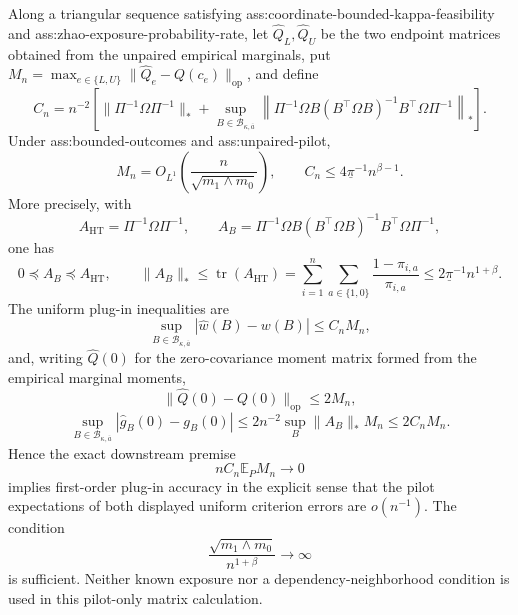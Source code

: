 Along a triangular sequence satisfying ass:coordinate-bounded-kappa-feasibility and ass:zhao-exposure-probability-rate, let \(\widehat Q_L,\widehat Q_U\) be the two endpoint matrices obtained from the unpaired empirical marginals, put \(M_n=\max_{e\in\{L,U\}}\lVert\widehat Q_e-Q(c_e)\rVert_{\mathrm{op}}\), and define
\[
C_n=n^{-2}\left[
\lVert\Pi^{-1}\Omega\Pi^{-1}\rVert_*
+\sup_{B\in\mathcal B_{\kappa,\overline a}}
\left\lVert\Pi^{-1}\Omega B(B^{\top}\Omega B)^{-1}B^{\top}\Omega\Pi^{-1}\right\rVert_*
\right].
\]
Under ass:bounded-outcomes and ass:unpaired-pilot,
\[
M_n=O_{L^1}\!\left(\frac{n}{\sqrt{m_1\wedge m_0}}\right),
\qquad
C_n\le4\underline\pi^{-1}n^{\beta-1}.
\]
More precisely, with
\[
A_{\mathrm{HT}}=\Pi^{-1}\Omega\Pi^{-1},
\qquad
A_B=\Pi^{-1}\Omega B(B^{\top}\Omega B)^{-1}B^{\top}\Omega\Pi^{-1},
\]
one has
\[
0\preceq A_B\preceq A_{\mathrm{HT}},
\qquad
\lVert A_B\rVert_*
\le\operatorname{tr}(A_{\mathrm{HT}})
=\sum_{i=1}^n\sum_{a\in\{1,0\}}\frac{1-\pi_{i,a}}{\pi_{i,a}}
\le2\underline\pi^{-1}n^{1+\beta}.
\]
The uniform plug-in inequalities are
\[
\sup_{B\in\mathcal B_{\kappa,\overline a}}|\widehat w(B)-w(B)|
\le C_nM_n,
\]
and, writing \(\widehat Q(0)\) for the zero-covariance moment matrix formed from the empirical marginal moments,
\[
\lVert\widehat Q(0)-Q(0)\rVert_{\mathrm{op}}\le2M_n,
\]
\[
\sup_{B\in\mathcal B_{\kappa,\overline a}}|\widehat g_B(0)-g_B(0)|
\le2n^{-2}\sup_B\lVert A_B\rVert_*M_n
\le2C_nM_n.
\]
Hence the exact downstream premise
\[
nC_n\mathbb E_PM_n\longrightarrow0
\]
implies first-order plug-in accuracy in the explicit sense that the pilot expectations of both displayed uniform criterion errors are \(o(n^{-1})\).  The condition
\[
\frac{\sqrt{m_1\wedge m_0}}{n^{1+\beta}}\longrightarrow\infty
\]
is sufficient.  Neither known exposure nor a dependency-neighborhood condition is used in this pilot-only matrix calculation.